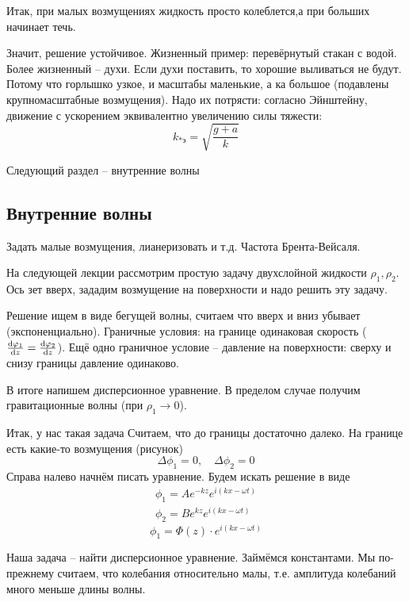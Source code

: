 Итак, при малых возмущениях жидкость просто колеблется,а при больших начинает течь.

Значит, решение устойчивое.
Жизненный пример: перевёрнутый стакан с водой.
Более жизненный -- духи.
Если духи поставить, то хорошие выливаться не будут.
Потому что горлышко узкое, и масштабы маленькие, а ка большое (подавлены крупномасштабные возмущения).
Надо их потрясти: согласно Эйнштейну, движение с ускорением эквивалентно увеличению силы тяжести:
\begin{equation}
    k_{*\text{э}} = \sqrt{\frac{g+a}{k}}
\end{equation}

Следующий раздел -- внутренние волны

\subsection{Внутренние волны}
Задать малые возмущения, лианеризовать и т.д. Частота Брента-Вейсаля.

На следующей лекции рассмотрим простую задачу двухслойной жидкости $\rho_1, \rho_2$.
Ось зет вверх, зададим возмущение на поверхности и надо решить эту задачу.

Решение ищем в виде бегущей волны, считаем что вверх и вниз убывает (экспоненциально).
Граничные условия: на границе одинаковая скорость ($\dv{\varphi_1}{z} = \dv{\varphi_2}{z}$).
Ещё одно граничное условие -- давление на поверхности: сверху и снизу границы давление одинаково.

В итоге напишем дисперсионное уравнение. В пределом случае получим гравитационные волны (при $\rho_1 \to 0$).


Итак, у нас такая задача
Считаем, что до границы достаточно далеко.
На границе есть какие-то возмущения
(рисунок)
\begin{equation}
    \Delta\phi_1 = 0, \quad \Delta\phi_2 = 0
\end{equation}
Справа налево начнём писать уравнение.
Будем искать решение в виде
\begin{gather}
    \phi_1 = A e^{-kz} e^{i(kx-\omega t)}\\
    \phi_2 = B e^{kz} e^{i(kx-\omega t)}
\end{gather}
\begin{equation}
    \phi_1 = \Phi(z)\cdot e^{i(kx-\omega t)}
\end{equation}

Наша задача -- найти дисперсионное уравнение. Займёмся константами. Мы по-прежнему считаем, что колебания относительно малы,
т.е. амплитуда колебаний много меньше длины волны.

